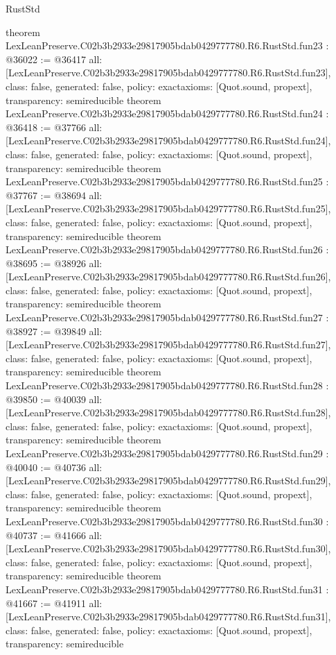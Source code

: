 \begin{lexlean}{RustStd}
\begin{coremodule}
{}
theorem LexLeanPreserve.C02b3b2933e29817905bdab0429777780.R6.RustStd.fun23 : @36022 := @36417 {
  all: [LexLeanPreserve.C02b3b2933e29817905bdab0429777780.R6.RustStd.fun23],
  class: false,
  generated: false,
  policy: exact{axioms: [Quot.sound, propext]},
  transparency: semireducible
}
theorem LexLeanPreserve.C02b3b2933e29817905bdab0429777780.R6.RustStd.fun24 : @36418 := @37766 {
  all: [LexLeanPreserve.C02b3b2933e29817905bdab0429777780.R6.RustStd.fun24],
  class: false,
  generated: false,
  policy: exact{axioms: [Quot.sound, propext]},
  transparency: semireducible
}
theorem LexLeanPreserve.C02b3b2933e29817905bdab0429777780.R6.RustStd.fun25 : @37767 := @38694 {
  all: [LexLeanPreserve.C02b3b2933e29817905bdab0429777780.R6.RustStd.fun25],
  class: false,
  generated: false,
  policy: exact{axioms: [Quot.sound, propext]},
  transparency: semireducible
}
theorem LexLeanPreserve.C02b3b2933e29817905bdab0429777780.R6.RustStd.fun26 : @38695 := @38926 {
  all: [LexLeanPreserve.C02b3b2933e29817905bdab0429777780.R6.RustStd.fun26],
  class: false,
  generated: false,
  policy: exact{axioms: [Quot.sound, propext]},
  transparency: semireducible
}
theorem LexLeanPreserve.C02b3b2933e29817905bdab0429777780.R6.RustStd.fun27 : @38927 := @39849 {
  all: [LexLeanPreserve.C02b3b2933e29817905bdab0429777780.R6.RustStd.fun27],
  class: false,
  generated: false,
  policy: exact{axioms: [Quot.sound, propext]},
  transparency: semireducible
}
theorem LexLeanPreserve.C02b3b2933e29817905bdab0429777780.R6.RustStd.fun28 : @39850 := @40039 {
  all: [LexLeanPreserve.C02b3b2933e29817905bdab0429777780.R6.RustStd.fun28],
  class: false,
  generated: false,
  policy: exact{axioms: [Quot.sound, propext]},
  transparency: semireducible
}
theorem LexLeanPreserve.C02b3b2933e29817905bdab0429777780.R6.RustStd.fun29 : @40040 := @40736 {
  all: [LexLeanPreserve.C02b3b2933e29817905bdab0429777780.R6.RustStd.fun29],
  class: false,
  generated: false,
  policy: exact{axioms: [Quot.sound, propext]},
  transparency: semireducible
}
theorem LexLeanPreserve.C02b3b2933e29817905bdab0429777780.R6.RustStd.fun30 : @40737 := @41666 {
  all: [LexLeanPreserve.C02b3b2933e29817905bdab0429777780.R6.RustStd.fun30],
  class: false,
  generated: false,
  policy: exact{axioms: [Quot.sound, propext]},
  transparency: semireducible
}
theorem LexLeanPreserve.C02b3b2933e29817905bdab0429777780.R6.RustStd.fun31 : @41667 := @41911 {
  all: [LexLeanPreserve.C02b3b2933e29817905bdab0429777780.R6.RustStd.fun31],
  class: false,
  generated: false,
  policy: exact{axioms: [Quot.sound, propext]},
  transparency: semireducible
}
\end{coremodule}
\end{lexlean}
